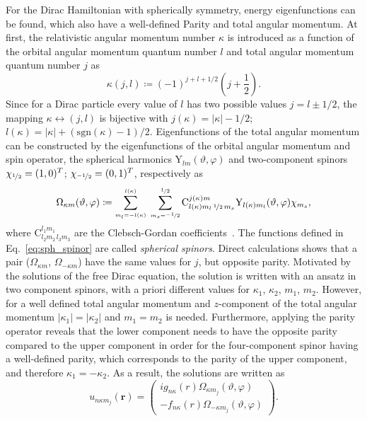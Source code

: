 For the Dirac Hamiltonian with spherically symmetry, energy eigenfunctions can be found, which also have a well-defined Parity and total angular momentum. At first, the relativistic angular momentum number $\kappa$ is introduced as a function of the orbital angular momentum quantum number $l$ and total angular momentum quantum number $j$ as
\begin{equation}
\kappa(j,l) \coloneqq (-1)^{j+l+1/2} \left(j+\frac{1}{2}\right).
\end{equation}
Since for a Dirac particle every value of $l$ has two possible values $j=l\pm 1/2$, the mapping $\kappa \leftrightarrow (j,l)$ is bijective with $j(\kappa)=|\kappa|-1/2$; $l(\kappa)=|\kappa|+(\mathrm{sgn}(\kappa)-1)/2$. Eigenfunctions of the total angular momentum can be constructed by the eigenfunctions of the orbital angular momentum and spin operator, the spherical harmonics $\text{Y}_{lm}(\vartheta,\varphi)$ and two-component spinors $\chi_{\nicefrac{1}{2}}=(1,0)^T$; $\chi_{\nicefrac{-1}{2}}=(0,1)^T$, respectively as
\begin{equation}
\Omega_{\kappa m}(\vartheta,\varphi)\coloneqq
\sum_{{\scriptscriptstyle {m_l}{=}{-l(\kappa)}}}^{\scriptscriptstyle l(\kappa)}\;
\sum_{{\scriptscriptstyle {m_s}{=}{\nicefrac{-1}{2}}}}^{\scriptscriptstyle \nicefrac{1}{2}}
\text{C}^{j(\kappa)m}_{l(\kappa)m_l\,\nicefrac{1}{2}\,m_s}
\text{Y}_{l(\kappa)m_l}(\vartheta,\varphi)\chi_{m_s},
\label{eq:sph_spinor}
\end{equation}
where $\text{C}^{l_1m_1}_{l_2m_2\,l_3m_3}$ are the Clebsch-Gordan coefficients~\cite{varshalovich1988}. The functions defined in Eq.~\eqref{eq:sph_spinor} are called \textit{spherical spinors}. Direct calculations shows that a pair ($\Omega_{\kappa m}$, $\Omega_{-\kappa m}$) have the same values for $j$, but opposite parity. Motivated by the solutions of the free Dirac equation, the solution is written with an ansatz in two component spinors, with a priori different values for $\kappa_1$, $\kappa_2$, $m_1$, $m_2$. 
However, for a well defined total angular momentum and $z$-component of the total angular momentum $|\kappa_1|=|\kappa_2|$ and $m_1=m_2$ is needed. Furthermore, applying the parity operator reveals that the lower component needs to have the opposite parity compared to the upper component in order for the four-component spinor having a well-defined parity, which corresponds to the parity of the upper component, and therefore $\kappa_1=-\kappa_2$. As a result, the solutions are written as
\begin{equation}
u_{n\kappa m_j}(\mathbf{r})=
\begin{pmatrix}
i g_{n\kappa}(r)\Omega_{\kappa m_j}(\vartheta,\varphi)\\
- f_{n\kappa}(r) \Omega_{-\kappa m_j}(\vartheta,\varphi)
\end{pmatrix}.
\label{eq:ansatz_dirac}
\end{equation}
